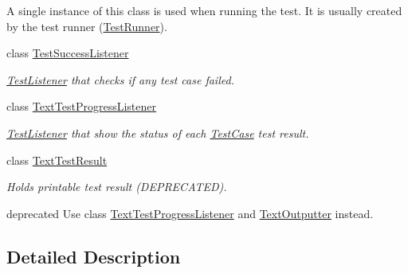 \begin{DoxyCompactItemize}
\begin{DoxyCompactList}
A single instance of this class is used when running the test. It is usually created by the test runner (\hyperlink{class_test_runner}{Test\+Runner}). \end{DoxyCompactList}\item 
class \hyperlink{class_test_success_listener}{Test\+Success\+Listener}
\begin{DoxyCompactList}\small\item\em \hyperlink{class_test_listener}{Test\+Listener} that checks if any test case failed. \end{DoxyCompactList}\item 
class \hyperlink{class_text_test_progress_listener}{Text\+Test\+Progress\+Listener}
\begin{DoxyCompactList}\small\item\em \hyperlink{class_test_listener}{Test\+Listener} that show the status of each \hyperlink{class_test_case}{Test\+Case} test result. \end{DoxyCompactList}\item 
class \hyperlink{class_text_test_result}{Text\+Test\+Result}
\begin{DoxyCompactList}\small\item\em Holds printable test result (D\+E\+P\+R\+E\+C\+A\+T\+E\+D).

deprecated Use class \hyperlink{class_text_test_progress_listener}{Text\+Test\+Progress\+Listener} and \hyperlink{class_text_outputter}{Text\+Outputter} instead. \end{DoxyCompactList}\end{DoxyCompactItemize}


\subsection{Detailed Description}
